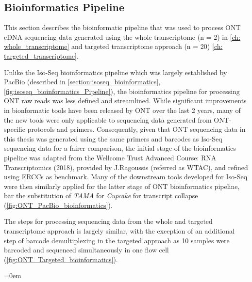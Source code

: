 \newpage
\subsection{Bioinformatics Pipeline}
This section describes the bioinformatic pipeline that was used to process ONT cDNA sequencing data generated using the whole transcriptome (n = 2) in \cref{ch: whole_transcriptome} and targeted transcriptome approach (n = 20) \cref{ch: targeted_transcriptome}. 

Unlike the Iso-Seq bioinformatics pipeline which was largely established by PacBio (described in \cref{section:isoseq_bioinformatics}, \cref{fig:isoseq_bioinformatics_Pipeline}), the bioinformatics pipeline for processing ONT raw reads was less defined and streamlined. While significant improvements in bionformatic tools have been released by ONT over the last 2 years, many of the new tools were only applicable to sequencing data generated from ONT-specific protocols and primers. Consequently, given that ONT sequencing data in this thesis was generated using the same primers and barcodes as Iso-Seq sequencing data for a fairer comparison, the initial stage of the bioinformatics pipeline was adapted from the Wellcome Trust Advanced Course: RNA Transcriptomics (2018), provided by J.Ragoussis (referred as WTAC), and refined using ERCCs as benchmark. Many of the downstream tools developed for Iso-Seq were then similarly applied for the latter stage of ONT bioinformatics pipeline, bar the substitution of \textit{TAMA} for \textit{Cupcake} for transcript collapse (\cref{fig:ONT_PacBio_bioinformatics}). 

The steps for processing sequencing data from the whole and targeted transcriptome approach is largely similar, with the exception of an additional step of barcode demultiplexing in the targeted approach as 10 samples were barcoded and sequenced simultaneously in one flow cell (\cref{fig:ONT_Targeted_bioinformatics}). 

\begingroup
\parindent=0em
\localtableofcontents 
\endgroup

